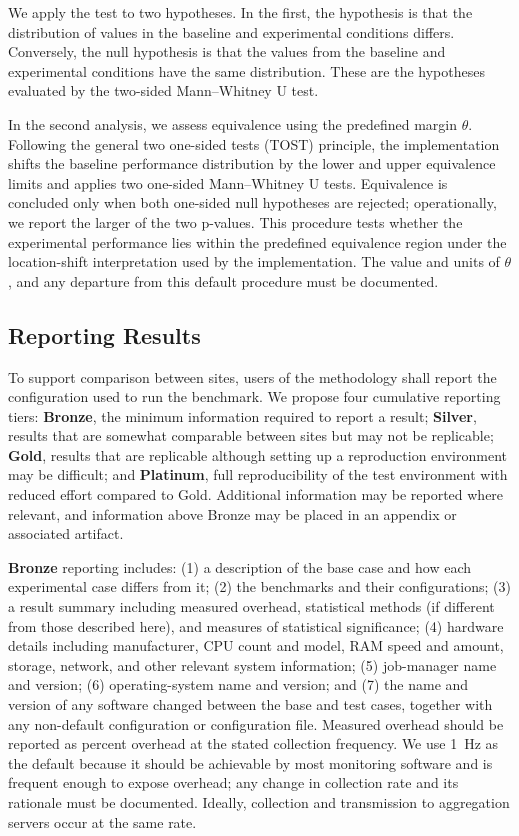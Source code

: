 \documentclass[conference]{IEEEtran}
\begin{document}
We apply the test to two hypotheses. In the first, the hypothesis is that the 
distribution of values in the baseline and experimental conditions differs. Conversely,
the null hypothesis is that the values from the baseline and experimental conditions 
have the same distribution.
These are the hypotheses evaluated by the two-sided Mann--Whitney U test.

In the second analysis, we assess equivalence using the predefined margin $\theta$.
Following the general two one-sided tests (TOST) principle\cite{lakensEquivalenceTestingPsychological2018},
the implementation shifts the baseline performance distribution by the lower and upper
equivalence limits and applies two one-sided Mann--Whitney U tests. Equivalence is concluded
only when both one-sided null hypotheses are rejected; operationally, we report the larger
of the two p-values. This procedure tests whether the experimental performance lies within
the predefined equivalence region under the location-shift interpretation used by the
implementation. The value and units of $\theta$, and any departure from this default
procedure must be documented.

\subsection{Reporting Results}

To support comparison between sites, users of the methodology shall report the configuration used to run the benchmark. We propose four cumulative reporting tiers: \textbf{Bronze}, the minimum information required to report a result; \textbf{Silver}, results that are somewhat comparable between sites but may not be replicable; \textbf{Gold}, results that are replicable although setting up a reproduction environment may be difficult; and \textbf{Platinum}, full reproducibility of the test environment with reduced effort compared to Gold. Additional information may be reported where relevant, and information above Bronze may be placed in an appendix or associated artifact.

\textbf{Bronze} reporting includes: (1) a description of the base case and how each experimental case differs from it; (2) the benchmarks and their configurations; (3) a result summary including measured overhead, statistical methods (if different from those described here), and measures of statistical significance; (4) hardware details including manufacturer, CPU count and model, RAM speed and amount, storage, network, and other relevant system information; (5) job-manager name and version; (6) operating-system name and version; and (7) the name and version of any software changed between the base and test cases, together with any non-default configuration or configuration file. Measured overhead should be reported as percent overhead at the stated collection frequency. We use 1~Hz as the default because it should be achievable by most monitoring software and is frequent enough to expose overhead; any change in collection rate and its rationale must be documented. Ideally, collection and transmission to aggregation servers occur at the same rate.
\end{document}

